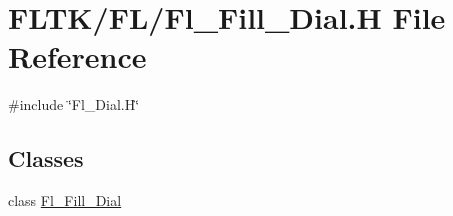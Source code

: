 \hypertarget{_fl___fill___dial_8_h}{}\section{F\+L\+T\+K/\+F\+L/\+Fl\+\_\+\+Fill\+\_\+\+Dial.H File Reference}
\label{_fl___fill___dial_8_h}
{\ttfamily \#include \char`\"{}Fl\+\_\+\+Dial.\+H\char`\"{}}\newline
\subsection*{Classes}
\begin{DoxyCompactItemize}
\item 
class \hyperlink{class_fl___fill___dial}{Fl\+\_\+\+Fill\+\_\+\+Dial}
\end{DoxyCompactItemize}
